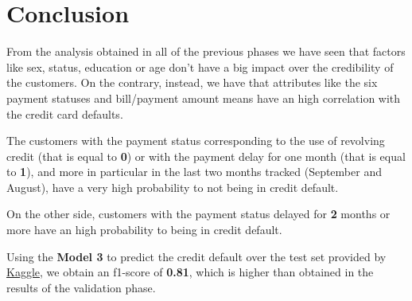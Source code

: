 \chapter{Conclusion}

From the analysis obtained in all of the previous phases we have seen that factors like sex, status, education or age don't have a big impact over the credibility of the customers. On the contrary, instead, we have that attributes like the six payment statuses and bill/payment amount means have an high correlation with the credit card defaults. 

\medskip

The customers with the payment status corresponding to the use of revolving credit (that is equal to \textbf{0}) or with the payment delay for one month (that is equal to \textbf{1}), and more in particular in the last two months tracked (September and August), have a very high probability to not being in credit default.

On the other side, customers with the payment status delayed for \textbf{2} months or more have an high probability to being in credit default.

\medskip

Using the \textbf{Model 3} to predict the credit default over the test set provided by \href{https://www.kaggle.com/c/data-mining-20182019-unipi/data}{Kaggle}, we obtain an f1-score of \textbf{0.81}, which is higher than obtained in the results of the validation phase.
